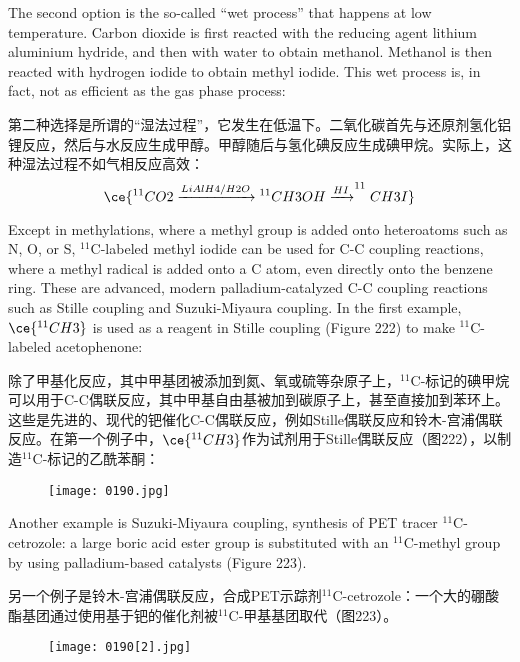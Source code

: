 \documentclass[dvipsnames, svgnames,a4paper,11pt]{article}
\begin{document}
The second option is the so-called “wet process” that happens at low temperature.
Carbon dioxide is first reacted with the reducing agent lithium aluminium hydride, and then with water
to obtain methanol. Methanol is then reacted with hydrogen iodide to obtain methyl iodide.
This wet process is, in fact, not as efficient as the gas phase process:

第二种选择是所谓的“湿法过程”，它发生在低温下。二氧化碳首先与还原剂氢化铝锂反应，然后与水反应生成甲醇。甲醇随后与氢化碘反应生成碘甲烷。实际上，这种湿法过程不如气相反应高效：
\[
\ce{^{11}CO2 \xrightarrow{LiAlH4/H2O} {}^{11}CH3OH \xrightarrow{HI} ^{11}CH3I}
\]

Except in methylations, where a methyl group is added onto heteroatoms such as N, O,
or S, ${}^\mathrm{11}\mathrm{C}$-labeled methyl iodide can be used for C-C coupling reactions, where
a methyl radical is added onto a C atom, even directly onto the benzene ring. These are
advanced, modern palladium-catalyzed C-C coupling reactions such as Stille
coupling and Suzuki-Miyaura coupling. In the first example, \(\ce{^{11}CH3}\) is used as a
reagent in Stille coupling (Figure 222) to make ${}^\mathrm{11}\mathrm{C}$-labeled acetophenone:

除了甲基化反应，其中甲基团被添加到氮、氧或硫等杂原子上，${}^\mathrm{11}\mathrm{C}$-标记的碘甲烷可以用于C-C偶联反应，其中甲基自由基被加到碳原子上，甚至直接加到苯环上。这些是先进的、现代的钯催化C-C偶联反应，例如Stille偶联反应和铃木-宫浦偶联反应。在第一个例子中，\(\ce{^{11}CH3}\)作为试剂用于Stille偶联反应（图222），以制造${}^\mathrm{11}\mathrm{C}$-标记的乙酰苯酮：


\begin{figure}[h]
	\centering
    \texttt{[image: 0190.jpg]}  
     \label{fig222}
\end{figure}

Another example is Suzuki-Miyaura coupling, synthesis of PET tracer ${}^\mathrm{11}\mathrm{C}$-cetrozole:
a large boric acid ester group is substituted with an ${}^\mathrm{11}\mathrm{C}$-methyl group by using
palladium-based catalysts (Figure 223).

另一个例子是铃木-宫浦偶联反应，合成PET示踪剂${}^\mathrm{11}\mathrm{C}$-cetrozole：一个大的硼酸酯基团通过使用基于钯的催化剂被${}^\mathrm{11}\mathrm{C}$-甲基基团取代（图223）。

\begin{figure}[h]
	\centering
    \texttt{[image: 0190[2].jpg]}  
     \label{fig223}
\end{figure}
\end{document}
